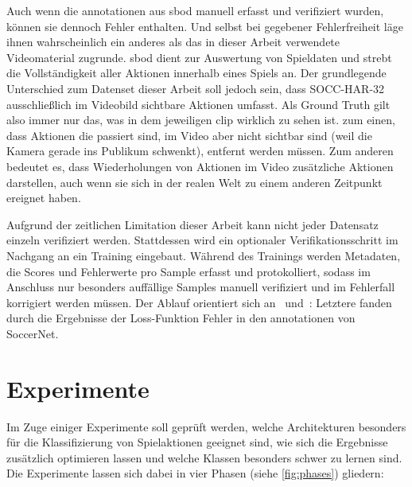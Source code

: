 Auch wenn die \gls{annotationen} aus \gls{sbod} manuell erfasst und verifiziert wurden, können sie dennoch Fehler enthalten.
Und selbst bei gegebener Fehlerfreiheit läge ihnen wahrscheinlich ein anderes als das in dieser Arbeit verwendete Videomaterial zugrunde.
\gls{sbod} dient zur Auswertung von Spieldaten und strebt die Vollständigkeit aller Aktionen innerhalb eines Spiels an.
Der grundlegende Unterschied zum Datenset dieser Arbeit soll jedoch sein, dass SOCC-HAR-32 ausschließlich im Videobild sichtbare Aktionen umfasst.
Als Ground Truth gilt also immer nur das, was in dem jeweiligen \gls{clip} wirklich zu sehen ist.
\Dh zum einen, dass Aktionen die passiert sind, im Video aber nicht sichtbar sind (\zB weil die Kamera gerade ins Publikum schwenkt), entfernt werden müssen.
Zum anderen bedeutet es, dass Wiederholungen von Aktionen im Video zusätzliche Aktionen darstellen, auch wenn sie sich in der realen Welt zu einem anderen Zeitpunkt ereignet haben.

Aufgrund der zeitlichen Limitation dieser Arbeit kann nicht jeder Datensatz einzeln verifiziert werden.
Stattdessen wird ein optionaler Verifikationsschritt im Nachgang an ein Training eingebaut.
Während des Trainings werden Metadaten, die Scores und Fehlerwerte pro Sample erfasst und protokolliert, sodass im Anschluss nur besonders auffällige Samples manuell verifiziert und im Fehlerfall korrigiert werden müssen.
Der Ablauf orientiert sich an~\cite{Gugger20} und~\cite{Cioppa20}:
Letztere fanden durch die Ergebnisse der Loss-Funktion Fehler in den \gls{annotationen} von SoccerNet.

\section{Experimente}
\label{sec:experimente}

Im Zuge einiger Experimente soll geprüft werden, welche Architekturen besonders für die Klassifizierung von Spielaktionen geeignet sind, wie sich die Ergebnisse zusätzlich optimieren lassen und welche Klassen besonders schwer zu lernen sind.
Die Experimente lassen sich dabei in vier Phasen (siehe \autoref{fig:phases}) gliedern:

